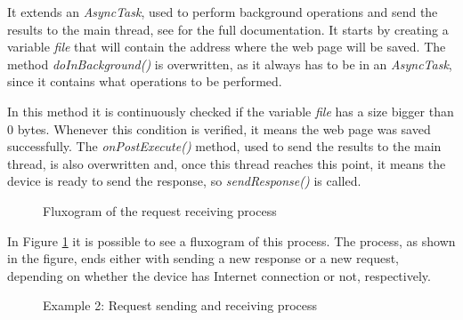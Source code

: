 It extends an \textit{AsyncTask}, used to perform background operations and send the results to the main thread, see \cite{async} for the full documentation. It starts by creating a variable \textit{file} that will contain the address where the web page will be saved. The method \textit{doInBackground()} is overwritten, as it always has to be in an \textit{AsyncTask}, since it contains what operations to be performed.

In this method it is continuously checked if the variable \textit{file} has a size bigger than 0 bytes. Whenever this condition is verified, it means the web page was saved successfully. The \textit{onPostExecute()} method, used to send the results to the main thread, is also overwritten and, once this thread reaches this point, it means the device is ready to send the response, so \textit{sendResponse()} is called.

\begin{figure}[ht]
   \noindent{}
	\caption{\label{fig:rqtrcvflux} Fluxogram of the request receiving process}
\end{figure}

In Figure \ref{fig:rqtrcvflux} it is possible to see a fluxogram of this process. The process, as shown in the figure, ends either with sending a new response or a new request, depending on whether the device has Internet connection or not, respectively.

\begin{figure}[ht]
   \noindent{}
	\caption{\label{fig:example1.1} Example 2: Request sending and receiving process}
\end{figure}

